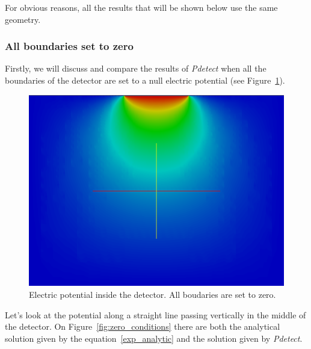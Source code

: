 \documentclass[11pt]{article}
\begin{document}
		For obvious reasons, all the results that will be shown below use the same geometry.

		\subsubsection{All boundaries set to zero}

			Firstly, we will discuss and compare the results of \textit{Pdetect} when all the
			boundaries of the detector are set to a null electric potential 
			(see Figure~\ref{fig:w_zero_conditions}).

			\begin{figure}[H]
				\center
				\includegraphics[scale=0.4]{images/boundary_conditions/w_zero_conditions.png}
				\caption{Electric potential inside the detector. All boudaries are set to zero.}
				\label{fig:w_zero_conditions}
			\end{figure}

			Let's look at the potential along a straight line passing vertically in the middle of
			the detector. On Figure~\ref{fig:zero_conditions} there are both the analytical solution
			given by the equation~\ref{exp_analytic} and the solution given by \textit{Pdetect}.
\end{document}
